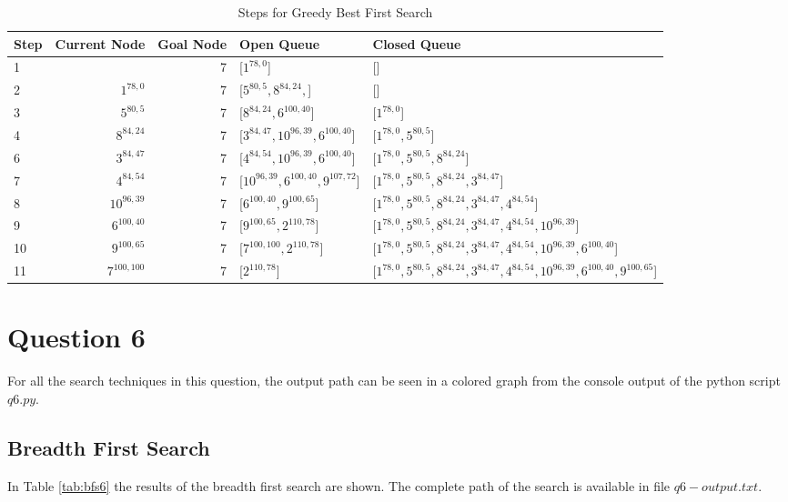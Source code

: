 \documentclass{article}
\begin{document}
    \begin{table}[!htp]\centering
        \caption{Steps for Greedy Best First Search}\label{tab:a*5}
        \scriptsize
        \begin{tabular}{lrrll}\toprule
        Step &Current Node &Goal Node & Open Queue &Closed Queue  \\\midrule
        1&  &7 &[$1^{78,0}$] &[] \\
        2& $1^{78,0}$ &7 &[$5^{80,5}, 8^{84,24}, $] &[] \\
        3& $5^{80,5}$ &7 &[$8^{84,24}, 6^{100, 40}$] &[$1^{78,0}$] \\
        4& $8^{84,24}$ &7 &[$3^{84,47}, 10^{96,39}, 6^{100, 40}$] &[$1^{78,0}, 5^{80,5}$] \\
        6& $3^{84,47}$ &7 &[$4^{84,54}, 10^{96,39}, 6^{100, 40}$] &[$1^{78,0}, 5^{80,5}, 8^{84,24}$] \\
        7& $4^{84,54}$ &7 &[$10^{96,39}, 6^{100, 40}, 9^{107,72}$] &[$1^{78,0}, 5^{80,5}, 8^{84,24}, 3^{84,47}$] \\
        8& $10^{96,39}$ &7 &[$6^{100, 40}, 9^{100,65}$] &[$1^{78,0}, 5^{80,5}, 8^{84,24}, 3^{84,47}, 4^{84,54}$] \\
        9& $6^{100, 40}$ &7 &[$9^{100,65}, 2^{110,78}$] &[$1^{78,0}, 5^{80,5}, 8^{84,24}, 3^{84,47}, 4^{84,54}, 10^{96,39}$] \\
        10& $9^{100,65}$ &7 &[$7^{100,100}, 2^{110,78}$] &[$1^{78,0}, 5^{80,5}, 8^{84,24}, 3^{84,47}, 4^{84,54}, 10^{96,39}, 6^{100, 40}$] \\
        11& $7^{100,100}$ &7 &[$2^{110,78}$] &[$1^{78,0}, 5^{80,5}, 8^{84,24}, 3^{84,47}, 4^{84,54}, 10^{96,39}, 6^{100, 40}, 9^{100,65}$] \\
        \end{tabular}
    \end{table}
\section{Question 6}
For all the search techniques in this question, the output path can be seen in a colored graph from the console output of the python script $q6.py$.

\subsection{Breadth First Search}
    In Table \ref{tab:bfs6} the results of the breadth first search are shown. The complete path of the search is available in file $q6-output.txt$.
    \setlength{\parskip}{6pt}
\end{document}
